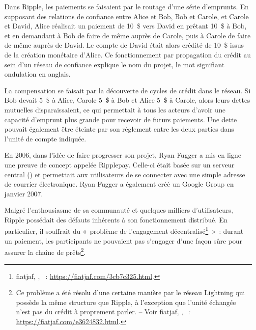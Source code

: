 Dans Ripple, les paiements se faisaient par le routage d'une série d'emprunts. En supposant des relations de confiance entre Alice et Bob, Bob et Carole, et Carole et David, Alice réalisait un paiement de 10~\$ vers David en prêtant 10~\$ à Bob, et en demandant à Bob de faire de même auprès de Carole, puis à Carole de faire de même auprès de David. Le compte de David était alors crédité de 10~\$ issus de la création monétaire d'Alice. Ce fonctionnement par propagation du crédit au sein d'un réseau de confiance explique le nom du projet, le mot  signifiant ondulation en anglais.

La compensation se faisait par la découverte de cycles de crédit dans le réseau. Si Bob devait 5~\$ à Alice, Carole 5~\$ à Bob et Alice 5~\$ à Carole, alors leurs dettes mutuelles disparaissaient, ce qui permettait à tous les acteurs d'avoir une capacité d'emprunt plus grande pour recevoir de futurs paiements. Une dette pouvait également être éteinte par son règlement entre les deux parties dans l'unité de compte indiquée.

En 2006, dans l'idée de faire progresser son projet, Ryan Fugger a mis en ligne une preuve de concept appelée Ripplepay. Celle-ci était basée sur un serveur central () et permettait aux utilisateurs de se connecter avec une simple adresse de courrier électronique. Ryan Fugger a également créé un Google Group en janvier 2007.

Malgré l'enthousiasme de sa communauté et quelques milliers d'utilisateurs, Ripple possédait des défauts inhérents à son fonctionnement distribué. En particulier, il souffrait du «~problème de l'engagement décentralisé\footnote{fiatjaf, , ~: \url{https://fiatjaf.com/3cb7c325.html}.}~»~: durant un paiement, les participants ne pouvaient pas s'engager d'une façon sûre pour assurer la chaîne de prêts\footnote{Ce problème a été résolu d'une certaine manière par le réseau Lightning qui possède la même structure que Ripple, à l'exception que l'unité échangée n'est pas du crédit à proprement parler. -- Voir fiatjaf, , ~: \url{https://fiatjaf.com/e3624832.html}.}.

